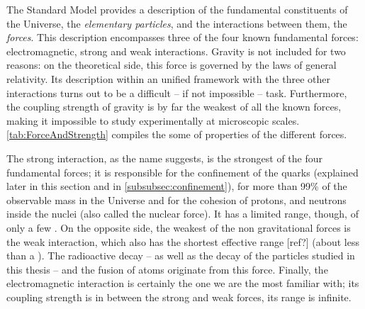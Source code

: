 The Standard Model provides a description of the fundamental constituents of the Universe, the \textit{elementary particles}, and the interactions between them, the  \textit{forces}. This description encompasses three of the four known fundamental forces: electromagnetic, strong and weak interactions. Gravity is not included for two reasons: on the theoretical side, this force is governed by the laws of general relativity. Its description within an unified framework with the three other interactions turns out to be a difficult -- if not impossible -- task. Furthermore, the coupling strength of gravity is by far the weakest of all the known forces, making it impossible to study experimentally at microscopic scales. \Tab\ref{tab:ForceAndStrength} compiles the some of properties of the different forces.

The strong interaction, as the name suggests, is the strongest of the four fundamental forces; it is responsible for the confinement of the quarks (explained later in this section and in \ref{subsubsec:confinement}), for more than 99\% of the observable mass in the Universe and for the cohesion of protons, and neutrons inside the nuclei (also called the nuclear force). It has a limited range, though, of only a few \fm. On the opposite side, the weakest of the non gravitational forces is the weak interaction, which also has the shortest effective range [ref?] (about less than a \fm). The radioactive decay --  as well as the decay of the particles studied in this thesis -- and the fusion of atoms originate from this force. Finally, the electromagnetic interaction is certainly the one we are the most familiar with; its coupling strength is in between the strong and weak forces, its range is infinite.\\

